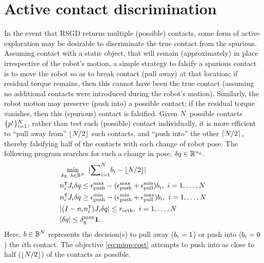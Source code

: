 \section{Active contact discrimination}
In the event that RSGD returns multiple (possible) contacts, some form of active exploration may be desirable to discriminate the true contact from the spurious.
Assuming contact with a static object, that will remain (approximately) in place irrespective of the robot's motion, a simple strategy to falsify a spurious contact is to move the robot so as to break contact (pull away) at that location; if residual torque remains, then this cannot have been the true contact (assuming no additional contacts were introduced during the robot's motion). 
Similarly, the robot motion may preserve (push into) a possible contact; if the residual torque vanishes, then this (spurious) contact is falsified. 
Given $N$ possible contacts 
$\lbrace p^{i}\rbrace_{i=1}^N$, 
rather than test each (possible) contact individually, it is more efficient to ``pull away from'' $\lfloor{N/2}\rfloor$ such contacts, and ``push into'' the other $\lceil{N/2}\rceil$, thereby falsifying half of the contacts with each change of robot pose. 
The following program searches for such a change in pose, ${\delta q}\in\mathbb{R}^{n_q}$.
\begin{subequations}
\label{eq:miqp}
\begin{align}
& \min_{{\delta q}, \ b\in\mathbb{B}^N} \ |{\sum}_{i=1}^N b_i - \lfloor{N/2}\rfloor | \label{eq:miqp:cost} \\
& n_i^\intercal{J}_i{\delta q} \leq \epsilon_\text{push}^\text{max} - (\epsilon_\text{push}^\text{max} + \epsilon_\text{pull}^\text{min})b_i, \ i = 1,\dots,N \label{eq:miqp:pull} \\
& n_i^\intercal{J}_i{\delta q} \geq \epsilon_\text{push}^\text{min} - (\epsilon_\text{push}^\text{min} + \epsilon_\text{pull}^\text{max})b_i, \ i = 1,\dots,N  \label{eq:miqp:push} \\
& | (I - n_in_i^\intercal){J}_i{\delta q} | \leq {r_\text{orth}}, \ i = 1,\dots,N \label{eq:miqp:orth} \\
& |{\delta q}| \leq \delta_{q}^\text{max}\mathbf{1}. \label{eq:miqp:lim}
\end{align}
\end{subequations}
Here, $b\in\mathbb{B}^N$ represents the decision(s) to pull away ($b_i=1$) or push into ($b_i=0$) the $i$th contact.
The objective \eqref{eq:miqp:cost} attempts to push into as close to half ($\lfloor{N/2}\rfloor$) of the contacts as possible.
